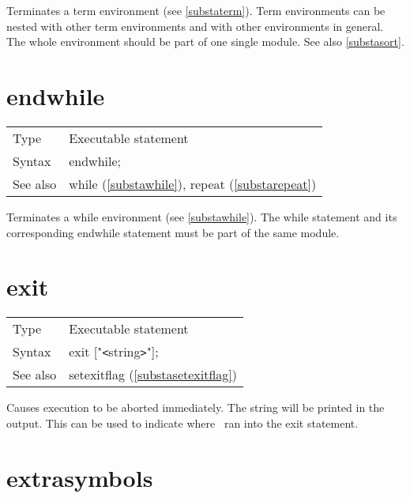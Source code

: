 \noindent Terminates a term environment 
(see \ref{substaterm}). Term environments can be nested with 
other term environments and with other environments in general. The whole 
environment should be part of one single module. See also \ref{substasort}. 
\vspace{10mm}


\section{endwhile}
\label{substaendwhile}

\noindent \begin{tabular}{ll}
Type & Executable statement\\
Syntax & endwhile;
\\ See also & while (\ref{substawhile}), repeat (\ref{substarepeat})
\end{tabular} \vspace{4mm}

\noindent Terminates a while environment (see \ref{substawhile}). The while 
statement and its corresponding endwhile statement must be part of the same 
module. \vspace{10mm}


\section{exit}
\label{substaexit}

\noindent \begin{tabular}{ll}
Type & Executable statement\\
Syntax & exit ["{\tt<}string{\tt>}"];
\\ See also & setexitflag (\ref{substasetexitflag})
\end{tabular} \vspace{4mm}

\noindent Causes execution to be aborted 
immediately. The string will be printed in the output. This can be used to 
indicate where \FORM\ ran into the exit statement. \vspace{10mm}


\section{extrasymbols}
\label{substaextrasymbols}

